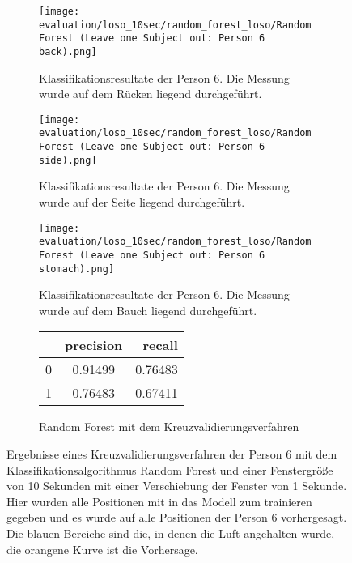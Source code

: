 \begin{figure}[ht]
    \centering
    \begin{subfigure}{1\textwidth}
        \texttt{[image: evaluation/loso\_10sec/random\_forest\_loso/Random Forest (Leave one Subject out: Person 6 back).png]}
        \caption{Klassifikationsresultate der Person 6. Die Messung wurde auf dem Rücken liegend durchgeführt.}
      \end{subfigure}
      \begin{subfigure}{1\textwidth}
        \texttt{[image: evaluation/loso\_10sec/random\_forest\_loso/Random Forest (Leave one Subject out: Person 6 side).png]}
        \caption{Klassifikationsresultate der Person 6. Die Messung wurde auf der Seite liegend durchgeführt.}
      \end{subfigure}
      \begin{subfigure}{1\textwidth}
        \texttt{[image: evaluation/loso\_10sec/random\_forest\_loso/Random Forest (Leave one Subject out: Person 6 stomach).png]}
        \caption{Klassifikationsresultate der Person 6. Die Messung wurde auf dem Bauch liegend durchgeführt.}
    \end{subfigure}
    \label{evaluation:random_forest_loso_10:person6}

    \begin{subfigure}{1\textwidth}
        \begin{center}
            \begin{tabular}{ | l | c | r | }
              \hline
               & precision & recall \\ \hline
              0 & 0.91499 & 0.76483 \\ \hline
              1 & 0.76483 & 0.67411 \\
              \hline
            \end{tabular}
        \end{center}
        \caption{Random Forest mit dem Kreuzvalidierungsverfahren}
        \label{implementation:app:screenshots:user_studies_information}
    \end{subfigure}
    \caption{Ergebnisse eines Kreuzvalidierungsverfahren der Person 6 mit dem Klassifikationsalgorithmus Random Forest und einer Fenstergröße von 10 Sekunden mit einer Verschiebung der Fenster von 1 Sekunde. Hier wurden alle Positionen mit in das Modell zum trainieren gegeben und es wurde auf alle Positionen der Person 6 vorhergesagt. Die blauen Bereiche sind die, in denen die Luft angehalten wurde, die orangene Kurve ist die Vorhersage.}
\end{figure}

